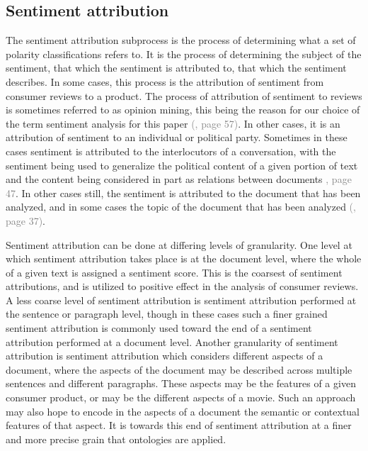 \documentclass[letterpaper, 10 pt, conference]{ieeeconf}
\begin{document}
\subsection{Sentiment attribution}
The sentiment attribution subprocess is the process of determining what a set of polarity classifications refers to. It is the process of determining the subject of the sentiment, that which the sentiment is attributed to, that which the sentiment describes. In some cases, this process is the attribution of sentiment from consumer reviews to a product. The process of attribution of sentiment to reviews is sometimes referred to as opinion mining, this being the reason for our choice of the term sentiment analysis for this paper \textcolor{gray}{(\cite{PangLee}, page 57)}. In other cases, it is an attribution of sentiment to an individual or political party. Sometimes in these cases sentiment is attributed to the interlocutors of a conversation, with the sentiment being used to generalize the political content of a given portion of text and the content being considered in part as relations between documents \textcolor{gray}{\cite{PangLee}, page 47}. In other cases still, the sentiment is attributed to the document that has been analyzed, and in some cases the topic of the document that has been analyzed \textcolor{gray}{(\cite{PangLee}, page 37)}.

Sentiment attribution can be done at differing levels of granularity. One level at which sentiment attribution takes place is at the document level, where the whole of a given text is assigned a sentiment score. This is the coarsest of sentiment attributions, and is utilized to positive effect in the analysis of consumer reviews. A less coarse level of sentiment attribution is sentiment attribution performed at the sentence or paragraph level, though in these cases such a finer grained sentiment attribution is commonly used toward the end of a sentiment attribution performed at a document level. Another granularity of sentiment attribution is sentiment attribution which considers different aspects of a document, where the aspects of the document may be described across multiple sentences and different paragraphs. These aspects may be the features of a given consumer product, or may be the different aspects of a movie. Such an approach may also hope to encode in the aspects of a document the semantic or contextual features of that aspect. It is towards this end of sentiment attribution at a finer and more precise grain that ontologies are applied.
\end{document}
